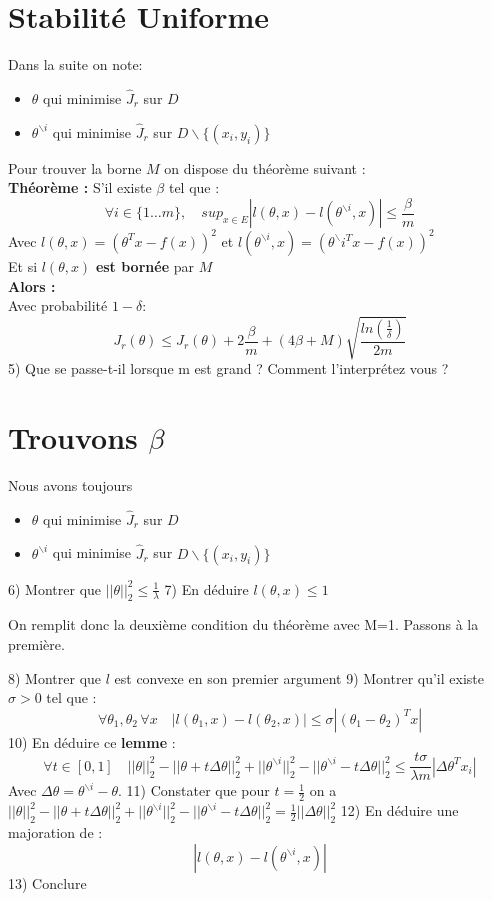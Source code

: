 \documentclass[12pt]{article}
\begin{document}
\section{ Stabilité Uniforme }   
Dans la suite on note:   
\begin{itemize}
\item $\theta$ qui minimise $\hat{J}_r$ sur $D$ 
\item $\theta^{ \backslash i}$  qui minimise $\hat{J}_r$ sur $D \backslash \{(x_i,y_i)\}$       
   
\end{itemize}

Pour trouver la borne $M$ on dispose du théorème suivant :  \\ 
\textbf{Théorème :} S'il existe $\beta$ tel que :  
$$ \forall i \in \{1 \dots m \},  \quad sup_{x \in E} |l(\theta,x)-l(\theta^{ \backslash i},x)| \leq \frac{\beta}{m}$$   
Avec $l(\theta,x) = (\theta^{T} x - f(x))^2$ et    $l(\theta^{\backslash i},x) = (\theta^\backslash{i}^{T} x - f(x))^2$    \\
Et si $l(\theta,x)$ \textbf{est bornée} par $M$  \\
\textbf{Alors :}    \\
Avec probabilité $1-\delta$:     
$$ J_r(\theta) \leq \hat{J}_r(\theta) + 2 \frac{\beta}{m} + (4\beta + M)\sqrt{\frac{ln(\frac{1}{\delta})}{2m}} $$   
5) Que se passe-t-il lorsque m est grand ? Comment l'interprétez vous ?
\newpage
\section{Trouvons $\beta$}
Nous avons toujours    
\begin{itemize}
\item $\theta$ qui minimise $\hat{J}_r$ sur $D$ 
\item $\theta^{ \backslash i}$  qui minimise $\hat{J}_r$ sur $D \backslash \{(x_i,y_i)\}$       
   
\end{itemize}
6) Montrer que $||\theta||^2_2 \leq \frac{1}{\lambda}$    
7) En déduire $l(\theta,x) \leq 1$      
    
On remplit donc la deuxième condition du théorème avec M=1.    
Passons à la première.   
    
8) Montrer que $l$ est convexe en son premier argument   
9) Montrer qu'il existe $\sigma > 0$ tel que :
$$ \forall \theta_1,\theta_2 \, \forall x \quad |l(\theta_1,x)-l(\theta_2,x)| \leq \sigma |(\theta_1 - \theta_2)^T x|$$      
10) En déduire ce \textbf{lemme} :      
$$ \forall t \in [0,1] \quad ||\theta||^2_2 - ||\theta + t \Delta \theta||_2^2 + ||\theta^{ \backslash i}||_2^2 - ||\theta^{ \backslash i} - t \Delta \theta||_2^2 \leq \frac{t \sigma}{\lambda m}|\Delta \theta^T x_i| $$   
Avec $\Delta \theta = \theta^{ \backslash i} - \theta$.    
11) Constater que pour $t=\frac{1}{2}$ on a $||\theta||^2_2 - ||\theta + t \Delta \theta||_2^2 + ||\theta^{ \backslash i}||_2^2 - ||\theta^{ \backslash i} - t \Delta \theta||_2^2 = \frac{1}{2}||\Delta \theta||^2_2$   
12) En déduire une majoration de : 
$$ |l(\theta,x)-l(\theta^{ \backslash i},x)| $$    
13) Conclure
\end{document}
